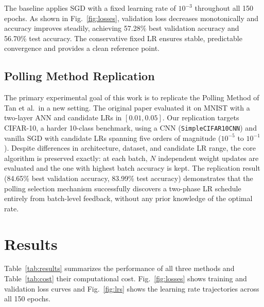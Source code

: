 \documentclass[conference]{IEEEtran}
\begin{document}
The baseline applies SGD with a fixed learning rate of $10^{-3}$ throughout all 150 epochs. As shown in Fig.~\ref{fig:losses}, validation loss decreases monotonically and accuracy improves steadily, achieving 57.28\% best validation accuracy and 56.70\% test accuracy. The conservative fixed LR ensures stable, predictable convergence and provides a clean reference point.

\subsection{Polling Method Replication}

The primary experimental goal of this work is to replicate the Polling Method of Tan et al.\ in a new setting. The original paper evaluated it on MNIST with a two-layer ANN and candidate LRs in $[0.01, 0.05]$. Our replication targets CIFAR-10, a harder 10-class benchmark, using a CNN (\texttt{SimpleCIFAR10CNN}) and vanilla SGD with candidate LRs spanning five orders of magnitude ($10^{-5}$ to $10^{-1}$). Despite differences in architecture, dataset, and candidate LR range, the core algorithm is preserved exactly: at each batch, $N$ independent weight updates are evaluated and the one with highest batch accuracy is kept. The replication result (84.65\% best validation accuracy, 83.99\% test accuracy) demonstrates that the polling selection mechanism successfully discovers a two-phase LR schedule entirely from batch-level feedback, without any prior knowledge of the optimal rate.

\section{Results}

Table~\ref{tab:results} summarizes the performance of all three methods and Table~\ref{tab:cost} their computational cost. Fig.~\ref{fig:losses} shows training and validation loss curves and Fig.~\ref{fig:lrs} shows the learning rate trajectories across all 150 epochs.

\begin{table}[htbp]
\caption{Performance Comparison Across Methods (150 Epochs)}
\begin{center}
\end{center}
\label{tab:results}
\end{table}
\end{document}
